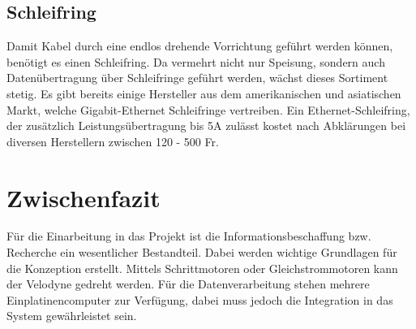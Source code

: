 \subsection{Schleifring}

Damit Kabel durch eine endlos drehende Vorrichtung geführt werden können, benötigt es einen Schleifring. Da vermehrt nicht nur Speisung, sondern auch Datenübertragung über Schleifringe geführt werden, wächst dieses Sortiment stetig. Es gibt bereits einige Hersteller aus dem amerikanischen und asiatischen Markt, welche Gigabit-Ethernet Schleifringe vertreiben. Ein Ethernet-Schleifring, der zusätzlich Leistungsübertragung bis 5A zulässt kostet nach Abklärungen bei diversen Herstellern zwischen 120 - 500 Fr.    


\section{Zwischenfazit}
\label{ZwischenfazitInfo}
Für die Einarbeitung in das Projekt ist die Informationsbeschaffung bzw. Recherche ein wesentlicher Bestandteil. Dabei werden wichtige Grundlagen für die Konzeption erstellt. Mittels Schrittmotoren oder Gleichstrommotoren kann der Velodyne gedreht werden. Für die Datenverarbeitung stehen mehrere Einplatinencomputer zur Verfügung, dabei muss jedoch die Integration in das System gewährleistet sein. 